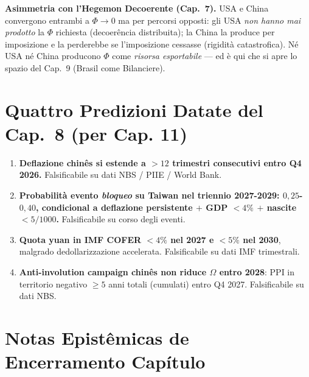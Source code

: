 \Hypoth{} \textbf{Asimmetria con l'Hegemon Decoerente (Cap.~7).} USA e
China convergono entrambi a \(\Phi \to 0\) ma per percorsi opposti: gli
USA \emph{non hanno mai prodotto} la \(\Phi\) richiesta (decoerência
distribuita); la China la produce per imposizione e la perderebbe se
l'imposizione cessasse (rigidità catastrofica). Né USA né China producono
\(\Phi\) come \emph{risorsa esportabile} --- ed è qui che si apre lo
spazio del Cap.~9 (Brasil come Bilanciere).



\section{Quattro Predizioni Datate del Cap.~8 (per Cap.
11)}\label{quattro-predizioni-datate-del-cap.-8-per-cap.-11}

\begin{enumerate}
\def\labelenumi{\arabic{enumi}.}
\tightlist
\item
  \textbf{Deflazione chinês si estende a \(> 12\) trimestri consecutivi
  entro Q4 2026.} Falsificabile su dati NBS / PIIE / World Bank.
\item
  \textbf{Probabilità evento \emph{bloqueo} su Taiwan nel triennio
  2027-2029: \(0{,}25\)-\(0{,}40\), condicional a deflazione
  persistente \(+\) GDP \(< 4\%\) \(+\) nascite \(< 5/1000\).}
  Falsificabile su corso degli eventi.
\item
  \textbf{Quota yuan in IMF COFER \(< 4\%\) nel 2027 e \(< 5\%\) nel
  2030}, malgrado dedollarizzazione accelerata. Falsificabile su dati
  IMF trimestrali.
\item
  \textbf{Anti-involution campaign chinês non riduce \(\Omega\) entro
  2028}: PPI in territorio negativo \(\geq 5\) anni totali (cumulati)
  entro Q4 2027. Falsificabile su dati NBS.
\end{enumerate}



\section{Notas Epistêmicas de Encerramento
Capítulo}\label{note-epistemiche-di-chiusura-capítulo}

